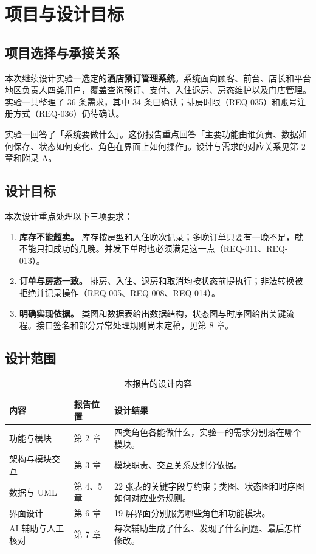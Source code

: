 \section{项目与设计目标}

\subsection{项目选择与承接关系}

本次继续设计实验一选定的\textbf{酒店预订管理系统}。系统面向顾客、前台、店长和平台地区负责人四类用户，覆盖查询预订、支付、入住退房、房态维护以及门店管理。实验一共整理了 36 条需求，其中 34 条已确认；排房时限（REQ-035）和账号注册方式（REQ-036）仍待确认。

实验一回答了「系统要做什么」。这份报告重点回答「主要功能由谁负责、数据如何保存、状态如何变化、角色在界面上如何操作」。设计与需求的对应关系见第 2 章和附录 A。

\subsection{设计目标}

本次设计重点处理以下三项要求：

\begin{enumerate}[leftmargin=3.2em]
  \item \textbf{库存不能超卖。} 库存按房型和入住晚次记录；多晚订单只要有一晚不足，就不能只扣成功的几晚。并发下单时也必须满足这一点（REQ-011、REQ-013）。
  \item \textbf{订单与房态一致。} 排房、入住、退房和取消均按状态前提执行；非法转换被拒绝并记录操作（REQ-005、REQ-008、REQ-014）。
  \item \textbf{明确实现依据。} 类图和数据表给出数据结构，状态图与时序图给出关键流程。接口签名和部分异常处理规则尚未定稿，见第 8 章。
\end{enumerate}

\subsection{设计范围}

\begin{table}[H]
\centering
\caption{本报告的设计内容}
\tabfont
\begin{tabularx}{\textwidth}{@{}L{2.8cm}L{3.2cm}X@{}}
\toprule
内容 & 报告位置 & 设计结果 \\
\midrule
功能与模块 & 第 2 章 & 四类角色各能做什么，实验一的需求分别落在哪个模块。 \\
架构与模块交互 & 第 3 章 & 模块职责、交互关系及划分依据。 \\
数据与 UML & 第 4、5 章 & 22 张表的关键字段与约束；类图、状态图和时序图如何对应业务规则。 \\
界面设计 & 第 6 章 & 19 屏界面分别服务哪些角色和功能模块。 \\
AI 辅助与人工核对 & 第 7 章 & 每次辅助生成了什么、发现了什么问题、最后怎样修改。 \\
\bottomrule
\end{tabularx}
\end{table}

